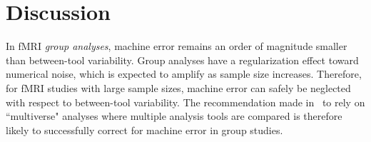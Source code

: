 \documentclass[conference]{IEEEtran}
\begin{document}
  
  \begin{figure}[ht]
    \end{figure}
  

\section{Discussion}

In fMRI \emph{group analyses}, machine error remains an order of magnitude
smaller than between-tool variability. Group analyses have a regularization
effect toward numerical noise, which is expected to amplify as sample size
increases. Therefore, for fMRI studies with large sample sizes, machine
error can safely be neglected with respect to between-tool variability. The
recommendation made in~\cite{botvinik2020variability} to rely on ``multiverse" analyses where
multiple analysis tools are compared is therefore likely to successfully correct
for machine error in group studies.
\end{document}
